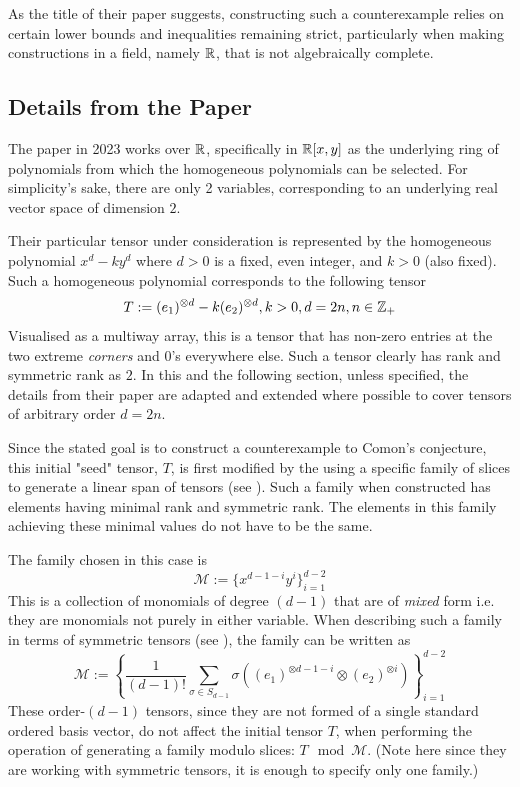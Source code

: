 \documentclass[../Lael_John_MasterThesis_Draft.tex]{subfiles}
\begin{document}
As the title of their paper suggests, constructing such a counterexample relies on certain lower bounds and inequalities remaining strict, particularly when making constructions in a field, namely $\mathbb{R}$, that is not algebraically complete.


\subsection{Details from the Paper}\label{subsection:seigaldetails}
The paper in 2023 \cite{wang_lower_2023} works over $\mathbb{R}$, specifically in $\mathbb{R}[x,y]$ as the underlying ring of polynomials from which the homogeneous polynomials can be selected. For simplicity's sake, there are only 2 variables, corresponding to an underlying real vector space of dimension $2$. 

Their particular tensor under consideration is represented by the homogeneous polynomial $x^d - ky^d$ where $d > 0$ is a fixed, even integer, and $k > 0$ (also fixed). Such a homogeneous polynomial corresponds to the following tensor \begin{equation}\label{eqn:wangoriginaltensor}
    T:= (e_1)^{\otimes d} - k (e_2)^{\otimes d}, k > 0 , d = 2n, n \in \mathbb{Z}_+
\end{equation}
Visualised as a multiway array, this is a tensor that has non-zero entries at the two extreme \textit{corners} and $0$'s everywhere else. Such a tensor clearly has rank and symmetric rank as $2$. In this and the following section, unless specified, the details from their paper are adapted and extended where possible to cover tensors of arbitrary order $d = 2n$. 

Since the stated goal is to construct a counterexample to Comon's conjecture, this initial "seed" tensor, $T$, is first modified by the using a specific family of slices to generate a linear span of tensors (see ). Such a family when constructed has elements having minimal rank and symmetric rank. The elements in this family achieving these minimal values do not have to be the same.

The family chosen in this case is \begin{equation}\label{eqn:wangslicingfamilypoly}
    \mathcal{M} := \{ x^{d-1-i}y^i \}_{i = 1}^{d-2}
\end{equation}This is a collection of monomials of degree $(d-1)$ that are of \textit{mixed} form i.e. they are monomials not purely in either variable. When describing such a family in terms of symmetric tensors (see ), the family can be written as \begin{equation}\label{eqn:wangslicingfamilytensor}
    \mathcal{M} := \left\{ \frac{1}{(d-1)!} \sum_{\sigma \in S_{d-1}} \sigma((e_1)^{\otimes d-1-i}\otimes (e_2)^{\otimes i})\right\}_{i = 1}^{d-2}
\end{equation}
These order-$(d-1)$ tensors, since they are not formed of a single standard ordered basis vector, do not affect the initial tensor $T$, when performing the operation of generating a family modulo slices: $T\mod\mathcal{M}$. (Note here since they are working with symmetric tensors, it is enough to specify only one family.)
\end{document}
